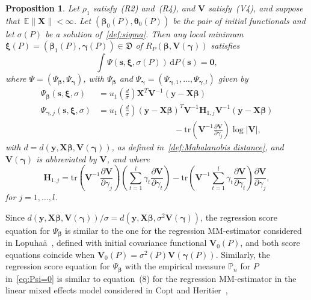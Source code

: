 \documentclass{article}
\numberwithin{equation}{section}
\theoremstyle{plain}
\newtheorem{proposition}{Proposition}
\newcommand{\dd}{\mathrm{d}}
\newcommand{\bbeta}{\bm\beta}
\newcommand{\btheta}{\bm\theta}
\newcommand{\bxi}{\bm\xi}
\newcommand{\bgamma}{\bm\gamma}
\newcommand{\by}{\mathbf{y}}
\newcommand{\bs}{\mathbf{s}}
\newcommand{\bX}{\mathbf{X}}
\newcommand{\bV}{\mathbf{V}}
\newcommand{\bH}{\mathbf{H}}
\newcommand{\E}{\mathbb{E}}
\begin{document}
\begin{proposition}
\label{prop:score equations}
Let $\rho_1$ satisfy~(R2) and~(R4), and $\bV$ satisfy~(V4), and suppose that~$\E\|\bX\|<\infty$.
Let $(\bbeta_0(P),\btheta_0(P))$ be the pair of initial functionals and let $\sigma(P)$ be a solution of~\eqref{def:sigma}.
Then any local minimum $\bxi(P)=(\bbeta_1(P),\bgamma(P))\in \mathfrak{D}$ of $R_P(\bbeta,\bV(\bgamma))$ satisfies
\begin{equation}
\label{eq:Psi=0}
\int
\Psi(\bs,\bxi,\sigma(P))
\,\dd P(\bs)
=
\mathbf{0},
\end{equation}
where $\Psi=(\Psi_{\bbeta},\Psi_{\bgamma})$, with $\Psi_{\bbeta}$ and $\Psi_{\bgamma}=(\Psi_{\bgamma,1},\ldots,\Psi_{\bgamma,l})$
given by
\begin{equation}
\label{def:Psi}
\begin{split}
\Psi_{\bbeta}(\bs,\bxi,\sigma)
&=
u_1\left(\frac{d}{\sigma}\right)
\bX^T\bV^{-1}(\by-\bX\bbeta)\\
\Psi_{\bgamma,j}(\bs,\bxi,\sigma)
&=
u_1\left(\frac{d}{\sigma}\right)
(\by-\bX\bbeta)^T\bV^{-1}
\bH_{1,j}
\bV^{-1}(\by-\bX\bbeta)\\
&\qquad\qquad\qquad\qquad\quad-
\mathrm{tr}\left(\bV^{-1}\frac{\partial \bV}{\partial \gamma_j}\right)\log|\bV|,
\end{split}
\end{equation}
with $d=d(\by,\bX\bbeta,\bV(\bgamma))$, as defined in~\eqref{def:Mahalanobis distance}, 
and $\bV(\bgamma)$ is abbreviated by $\bV$, and where
\begin{equation}
\label{def:Hj}
\bH_{1,j}
=
\mathrm{tr}\left(\bV^{-1}\frac{\partial \bV}{\partial \gamma_j}\right)
\left(
\sum_{t=1}^l\gamma_t\frac{\partial \bV}{\partial \gamma_t}
\right)
-
\mathrm{tr}\left(\bV^{-1}\sum_{t=1}^l\gamma_t\frac{\partial \bV}{\partial \gamma_t}\right)
\frac{\partial \bV}{\partial \gamma_j},
\end{equation}
for $j=1,\ldots,l$.
\end{proposition}
Since $d(\by,\bX\bbeta,\bV(\bgamma))/\sigma=d(\by,\bX\bbeta,\sigma^2\bV(\bgamma))$,
the regression score equation for $\Psi_{\bbeta}$ is similar to 
the one for the regression MM-estimator considered in Lopuha\"a~\cite{lopuhaa2023},
defined with initial covariance functional $\bV_0(P)$, 
and both score equations coincide when $\bV_0(P)=\sigma^2(P)\bV(\bgamma(P))$.
Similarly, the regression score equation for $\Psi_{\bbeta}$ with the empirical measure $\mathbb{P}_n$ for $P$ in~\eqref{eq:Psi=0}
is similar to equation~(8) for the regression MM-estimator in the linear mixed effects model considered in Copt and Heritier~\cite{copt&heritier2007},
\end{document}
